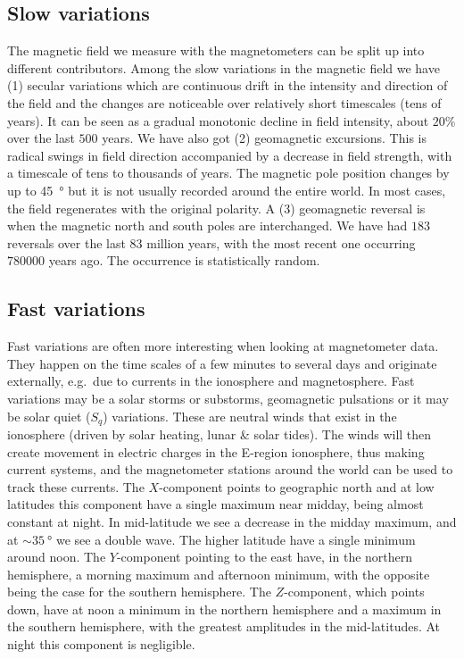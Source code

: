 \subsection{Slow variations}
The magnetic field we measure with the magnetometers can be split up into different contributors. Among the slow variations in the magnetic field we have (1) secular variations which are continuous drift in the intensity and direction of the field and the changes are noticeable over relatively short timescales (tens of years). It can be seen as a gradual monotonic decline in field intensity, about \(20\% \) over the last \(500\) years. We have also got (2) geomagnetic excursions. This is radical swings in field direction accompanied by a decrease in field strength, with a timescale of tens to thousands of years. The magnetic pole position changes by up to \SI{45}{\degree} but it is not usually recorded around the entire world. In most cases, the field regenerates with the original polarity. A (3) geomagnetic reversal is when the magnetic north and south poles are interchanged. We have had \(183\) reversals over the last \(83\) million years, with the most recent one occurring \(\num{780000}\) years ago. The occurrence is statistically random.

\subsection{Fast variations}
Fast variations are often more interesting when looking at magnetometer data. They happen on the time scales of a few minutes to several days and originate externally, e.g.\ due to currents in the ionosphere and magnetosphere. Fast variations may be a solar storms or substorms, geomagnetic pulsations or it may be solar quiet (\(S_q\)) variations. These are neutral winds that exist in the ionosphere (driven by solar heating, lunar \& solar tides). The winds will then create movement in electric charges in the E-region ionosphere, thus making current systems, and the magnetometer stations around the world can be used to track these currents. The \(X\)-component points to geographic north and at low latitudes this component have a single maximum near midday, being almost constant at night. In mid-latitude we see a decrease in the midday maximum, and at \(\sim\SI{35}{\degree}\) we see a double wave. The higher latitude have a single minimum around noon. The \(Y\)-component pointing to the east have, in the northern hemisphere, a morning maximum and afternoon minimum, with the opposite being the case for the southern hemisphere. The \(Z\)-component, which points down, have at noon a minimum in the northern hemisphere and a maximum in the southern hemisphere, with the greatest amplitudes in the mid-latitudes. At night this component is negligible.

